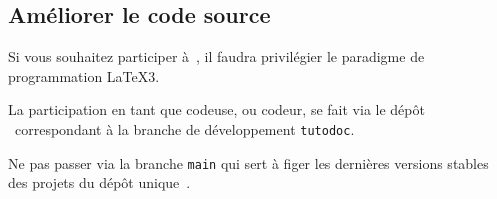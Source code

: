 \documentclass{tutodoc}
\begin{document}

\subsection{Améliorer le code source}

\begin{tdocimp}
    Si vous souhaitez participer à \thisproj\,, il faudra privilégier le paradigme de programmation \LaTeX3.
\end{tdocimp}


La participation en tant que codeuse, ou codeur, se fait via le dépôt \thisrepo\ correspondant à la branche de développement \verb#tutodoc#.


\begin{tdoccaut}
	Ne pas passer via la branche \verb#main# qui sert à figer les dernières versions stables des projets du dépôt unique \thismonorepo\,.
\end{tdoccaut}
\end{document}
